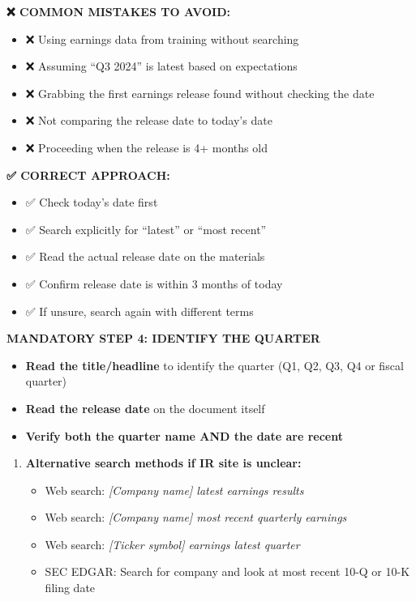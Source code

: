 \documentclass[11pt]{article}
\begin{document}
\textbf{❌ COMMON MISTAKES TO AVOID:}

\begin{itemize}[leftmargin=*,itemsep=2pt,topsep=2pt]
\item {} ❌ Using earnings data from training without searching
\item {} ❌ Assuming ``Q3 2024'' is latest based on expectations
\item {} ❌ Grabbing the first earnings release found without checking the date
\item {} ❌ Not comparing the release date to today's date
\item {} ❌ Proceeding when the release is 4+ months old
\end{itemize}

\textbf{✅ CORRECT APPROACH:}

\begin{itemize}[leftmargin=*,itemsep=2pt,topsep=2pt]
\item {} ✅ Check today's date first
\item {} ✅ Search explicitly for ``latest'' or ``most recent''
\item {} ✅ Read the actual release date on the materials
\item {} ✅ Confirm release date is within 3 months of today
\item {} ✅ If unsure, search again with different terms
\end{itemize}

\textbf{MANDATORY STEP 4: IDENTIFY THE QUARTER}

\begin{itemize}[leftmargin=*,itemsep=2pt,topsep=2pt]
\item {} \textbf{Read the title/headline} to identify the quarter (Q1, Q2, Q3, Q4 or fiscal quarter)
\item {} \textbf{Read the release date} on the document itself
\item {} \textbf{Verify both the quarter name AND the date are recent}
\end{itemize}
\begin{enumerate}[leftmargin=*,itemsep=2pt,topsep=2pt]
\item {} \textbf{Alternative search methods if IR site is unclear:}
\begin{itemize}[leftmargin=*,itemsep=2pt,topsep=2pt]
\item {} Web search: \emph{[Company name] latest earnings results}
\item {} Web search: \emph{[Company name] most recent quarterly earnings}
\item {} Web search: \emph{[Ticker symbol] earnings latest quarter}
\item {} SEC EDGAR: Search for company and look at most recent 10-Q or 10-K filing date
\end{itemize}
\end{enumerate}
\end{document}
